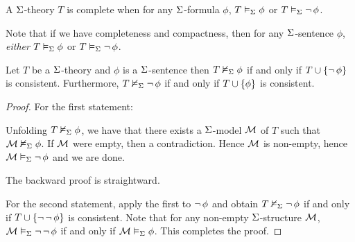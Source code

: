 \begin{dfn}[Complete]
    A $\Sigma$-theory $T$ is complete when 
    for any $\Sigma$-formula $\phi$, 
    $T \vDash_{\Sigma} \phi$ or 
    $T \vDash_{\Sigma} \neg\, \phi$.
\end{dfn}
Note that if we have completeness and compactness,
then for any $\Sigma$-sentence $\phi$,
\emph{either} $T \vDash_{\Sigma} \phi$ or 
$T \vDash_{\Sigma} \neg\, \phi$.

\begin{prop}
    Let $T$ be a $\Sigma$-theory
    and $\phi$ is a $\Sigma$-sentence
    then $T \nvDash_{\Sigma} \phi$
    if and only if $T \cup \left\{ \neg\, \phi\right\}$ is consistent.
    Furthermore, $T \nvDash_{\Sigma} \neg\, \phi$
    if and only if $T \cup \left\{ \phi\right\}$ is consistent.
\end{prop}
\begin{proof}
    For the first statement:
    \begin{forward}
        Unfolding $T \nvDash_{\Sigma} \phi$,
        we have that there exists a $\Sigma$-model $\mathcal{M}$ of $T$ 
        such that $\mathcal{M} \nvDash_{\Sigma} \phi$.
        If $\mathcal{M}$ were empty, then 
        a contradiction.
        Hence $\mathcal{M}$ is non-empty, 
        hence $\mathcal{M} \vDash_{\Sigma} \neg\, \phi$ and we are done.
    \end{forward}
    The backward proof is straightward.

    For the second statement, 
    apply the first to $\neg\, \phi$ and obtain 
    $T \nvDash_{\Sigma} \neg\, \phi$
    if and only if $T \cup \left\{\neg\, \neg\, \phi\right\}$ is consistent.
    Note that for any non-empty $\Sigma$-structure $\mathcal{M}$, 
    $\mathcal{M} \vDash_{\Sigma} \neg\, \neg\, \phi$ 
    if and only if $\mathcal{M} \vDash_{\Sigma} \phi$.
    This completes the proof.
\end{proof}

